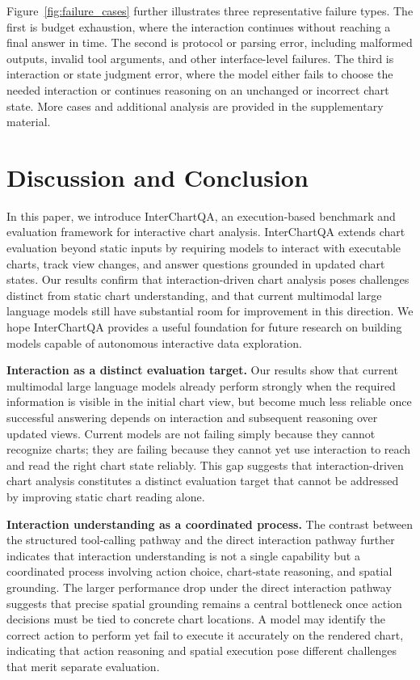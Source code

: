 \documentclass[review,journal,hideappendix]{vgtc} %
\begin{document}
Figure~\ref{fig:failure_cases} further illustrates three representative failure types.
The first is budget exhaustion, where the interaction continues without reaching a final answer in time.
The second is protocol or parsing error, including malformed outputs, invalid tool arguments, and other interface-level failures. 
The third is interaction or state judgment error, where the model either fails to choose the needed interaction or continues reasoning on an unchanged or incorrect chart state. More cases and additional analysis are provided in the supplementary material.

\section{Discussion and Conclusion}

In this paper, we introduce InterChartQA, an execution-based benchmark and evaluation framework for interactive chart analysis. InterChartQA extends chart evaluation beyond static inputs by requiring models to interact with executable charts, track view changes, and answer questions grounded in updated chart states. Our results confirm that interaction-driven chart analysis poses challenges distinct from static chart understanding, and that current multimodal large language models still have substantial room for improvement in this direction. We hope InterChartQA provides a useful foundation for future research on building models capable of autonomous interactive data exploration.

\vspace{1.2mm}\noindent\textbf{Interaction as a distinct evaluation target.} Our results show that current multimodal large language models already perform strongly when the required information is visible in the initial chart view, but become much less reliable once successful answering depends on interaction and subsequent reasoning over updated views. Current models are not failing simply because they cannot recognize charts; they are failing because they cannot yet use interaction to reach and read the right chart state reliably. This gap suggests that interaction-driven chart analysis constitutes a distinct evaluation target that cannot be addressed by improving static chart reading alone.

\vspace{1.2mm}\noindent\textbf{Interaction understanding as a coordinated process.} The contrast between the structured tool-calling pathway and the direct interaction pathway further indicates that interaction understanding is not a single capability but a coordinated process involving action choice, chart-state reasoning, and spatial grounding. The larger performance drop under the direct interaction pathway suggests that precise spatial grounding remains a central bottleneck once action decisions must be tied to concrete chart locations. A model may identify the correct action to perform yet fail to execute it accurately on the rendered chart, indicating that action reasoning and spatial execution pose different challenges that merit separate evaluation.
\end{document}

